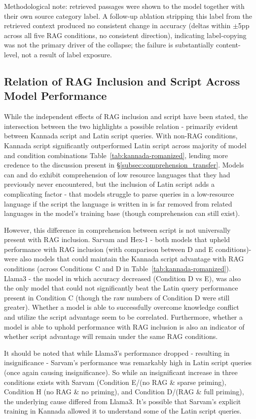 \documentclass[11pt]{article}
\begin{document}
Methodological note: retrieved passages were shown to the model together with their own source category label. A follow-up ablation stripping this label from the retrieved context produced no consistent change in accuracy (deltas within $\pm$5pp across all five RAG conditions, no consistent direction), indicating label-copying was not the primary driver of the collapse; the failure is substantially content-level, not a result of label exposure.

\subsection{Relation of RAG Inclusion and Script Across Model Performance}
While the independent effects of RAG inclusion and script have been stated, the intersection between the two highlights a possible relation - primarily evident between Kannada script and Latin script queries. With non-RAG conditions, Kannada script significantly outperformed Latin script across majority of model and condition combinations Table~\ref{tab:kannada-romanized}, lending more credence to the discussion present in \S\ref{subsec:comprehension_transfer}. Models can and do exhibit comprehension of low resource languages that they had previously never encountered, but the inclusion of Latin script adds a complicating factor - that models struggle to parse queries in a low-resource language if the script the language is written in is far removed from related languages in the model's training base (though comprehension can still exist). 

However, this difference in comprehension between script is not universally present with RAG inclusion. Sarvam and Hex-1 - both models that upheld performance with RAG inclusion (with comparison between D and E conditions)- were also models that could maintain the Kannada script advantage with RAG conditions (across Conditions C and D in Table~\ref{tab:kannada-romanized}). Llama3 - the model in which accuracy decreased (Condition D vs E), was also the only model that could not significantly beat the Latin query performance present in Condition C (though the raw numbers of Condition D were still greater). Whether a model is able to successfully overcome knowledge conflict and utilize the script advantage seem to be correlated. Furthermore, whether a model is able to uphold performance with RAG inclusion is also an indicator of whether script advantage will remain under the same RAG conditions. 

It should be noted that while Llama3's performance dropped - resulting in insignificance - Sarvam's performance was remarkably high in Latin script queries (once again causing insignificance). So while an insignificant increase in three conditions exists with Sarvam (Condition E/(no RAG \& sparse priming), Condition H (no RAG \& no priming), and Condition D/(RAG \& full priming), the underlying cause differed from Llama3. It's possible that Sarvam's explicit training in Kannada allowed it to understand some of the Latin script queries. 
\end{document}

